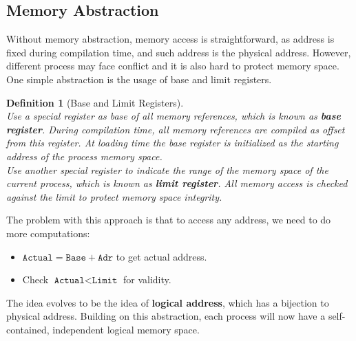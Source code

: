 \documentclass[12pt]{article}
\newtheorem{definition}{Definition}[section]
\theoremstyle{definition}
\begin{document}
\subsection{Memory Abstraction}
Without memory abstraction, memory access is straightforward, as address is fixed during compilation time, and such address is the physical address. However, different process may face conflict and it is also hard to protect memory space. \\
One simple abstraction is the usage of base and limit registers.
\begin{definition}[Base and Limit Registers]
\hfill\\\normalfont Use a special register as base of all memory references, which is known as \textbf{base register}. During compilation time, all memory references are compiled as \textit{offset} from this register. At loading time the base register is initialized as the starting address of the process memory space.\\
Use another special register to indicate the range of the memory space of the current process, which is known as \textbf{limit register}. All memory access is checked against the limit to protect memory space integrity.
\end{definition}
The problem with this approach is that to access any address, we need to do more computations:
\begin{itemize}
\item $\texttt{Actual}=\texttt{Base}+\texttt{Adr}$ to get actual address.
\item Check $\texttt{Actual}<\texttt{Limit}$ for validity.
\end{itemize}
The idea evolves to be the idea of \textbf{logical address}, which has a bijection to physical address. Building on this abstraction, each process will now have a self-contained, independent logical memory space.
\end{document}
